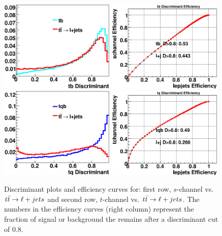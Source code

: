 \begin{figure}[!h!tbp]
\includegraphics[width=0.49\textwidth]
{eps/MatrixElement/performance/tb_Discriminant__schannel_lepjets}
\includegraphics[width=0.49\textwidth]
{eps/MatrixElement/performance/tb_Efficiency__schannel_lepjets}
\includegraphics[width=0.49\textwidth]
{eps/MatrixElement/performance/tq_Discriminant__tchannel_lepjets}
\includegraphics[width=0.49\textwidth]
{eps/MatrixElement/performance/tq_Efficiency__tchannel_lepjets}
\caption{Discriminant plots and efficiency curves for:
first row, $s$-channel vs. $\mbox{$t\bar{t}$} \rightarrow \ell + jets$ and second row, $t$-channel
vs. $\mbox{$t\bar{t}$} \rightarrow \ell + jets$. The numbers in the
efficiency curves (right column) represent the fraction of signal or
background the remains after a discriminant cut of 0.8.}
\label{disc_lepjets}
\end{figure}



